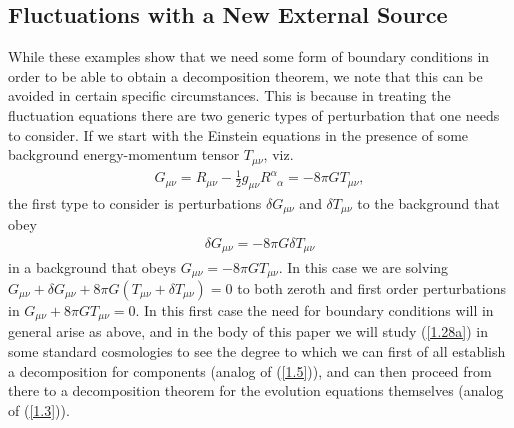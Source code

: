 \documentclass[aps,onecolumn,10pt]{revtex4}
\numberwithin{equation}{section}
\numberwithin{equation}{section}
\begin{document}
\subsection{Fluctuations with a New External Source}
\label{S1d}

While these examples show that we need some form of boundary conditions in order to be able to obtain a decomposition theorem, we note that this can be avoided in certain specific circumstances. This is because in treating the fluctuation equations there are two generic types of perturbation that one needs to consider. If we start with the Einstein equations in the presence of some background energy-momentum tensor $T_{\mu\nu}$, viz. 
%
\begin{eqnarray}
 G_{\mu\nu}=R_{\mu\nu}-\frac{1}{2}g_{\mu\nu}R^{\alpha}_{\phantom{\alpha}\alpha}
 =-8\pi G T_{\mu\nu},
\label{1.27a}
\end{eqnarray}
%
the first type to consider is perturbations $\delta G_{\mu\nu}$ and $\delta T_{\mu\nu}$ to the background that obey 
%
\begin{eqnarray}
\delta G_{\mu\nu}=-8\pi G \delta T_{\mu\nu}
\label{1.28a}
\end{eqnarray}
%
in a background that obeys $G_{\mu\nu}=-8\pi G T_{\mu\nu}$. In this case we are solving $G_{\mu\nu}+\delta G_{\mu\nu}+8\pi G (T_{\mu\nu}+\delta T_{\mu\nu})=0$ to both zeroth and first order perturbations in $G_{\mu\nu}+8\pi G T_{\mu\nu}=0$.  In this first case the need for boundary conditions will in general arise as above, and in the body of this paper we will study (\ref{1.28a}) in some standard cosmologies to see the degree to which we can first of all establish a decomposition for components (analog of (\ref{1.5})), and can then proceed from there to a decomposition theorem for the evolution equations themselves (analog of (\ref{1.3})). 
\end{document}
